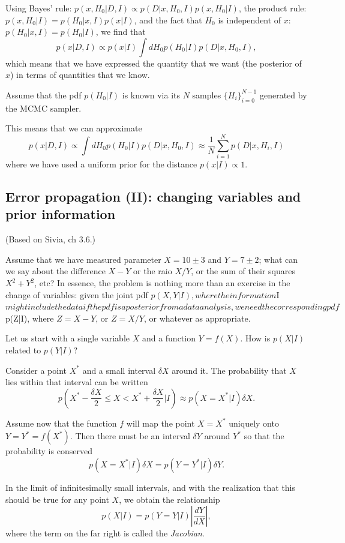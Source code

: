 \documentclass[%
oneside,                 %
final,                   %
10pt]{article}
\begin{document}
Using Bayes' rule: $p(x,H_0|D,I) \propto p(D|x,H_0,I) p(x,H_0|I)$, the product rule: $p(x,H_0|I) = p(H_0|x,I)p(x|I)$, and the fact that $H_0$ is independent of $x$: $p(H_0|x,I) = p(H_0|I)$, we find that
\[
p(x|D,I) \propto p(x|I) \int dH_0 p(H_0|I) p(D|x,H_0,I),
\]
which means that we have expressed the quantity that we want (the posterior of $x$) in terms of quantities that we know.

Assume that the pdf $p(H_0 | I)$ is known via its $N$ samples $\{H_{i}\}_{i=0}^{N-1}$ generated by the MCMC sampler.

This means that we can approximate 
\[
p(x |D,I) \propto \int dH_0 p(H_0|I) p(D|x,H_0,I) \approx \frac{1}{N} \sum_{i=1}^N p(D | x, H_i, I)
\]
where we have used a uniform prior for the distance $p(x|I) \propto 1$.


\subsection{Error propagation (II): changing variables and prior information}
(Based on Sivia, ch 3.6.)

Assume that we have measured parameter $X = 10 \pm 3$ and $Y=7 \pm 2$; what can we say about the difference $X-Y$ or the raio $X/Y$, or the sum of their squares $X^2+Y^2$, etc? In essence, the problem is nothing more than an exercise in the change of variables: given the joint pdf $p(X,Y|I), where the information $I$ might include the data if the pdf is a posterior from a data analysis, we need the corresponding pdf $p(Z|I), where $Z=X-Y$, or $Z=X/Y$, or whatever as appropriate.

Let us start with a single variable $X$ and a function $Y=f(X)$. How is $p(X|I)$ related to $p(Y|I)$?

Consider a point $X^*$ and a small interval $\delta X$ around it. The probability that $X$ lies within that interval can be written
\[
p \left( X^* - \frac{\delta X}{2} \le X < X^* + \frac{\delta X}{2} \big| I \right) 
\approx p(X=X^*|I) \delta X.
\]

Assume now that the function $f$ will map the point $X=X^*$ uniquely onto $Y=Y^*=f(X^*)$. Then there must be an interval $\delta Y$ around $Y^*$ so that the probability is conserved
\[
p(X=X^*|I) \delta X = p(Y=Y^*|I) \delta Y.
\]

In the limit of infinitesimally small intervals, and with the realization that this should be true for any point $X$, we obtain the relationship
\begin{equation}
p(X|I) = p(Y=Y|I) \left| \frac{dY}{dX} \right|,
\label{eq:transformation}
\end{equation}
where the term on the far right is called the \emph{Jacobian}.
\end{document}
